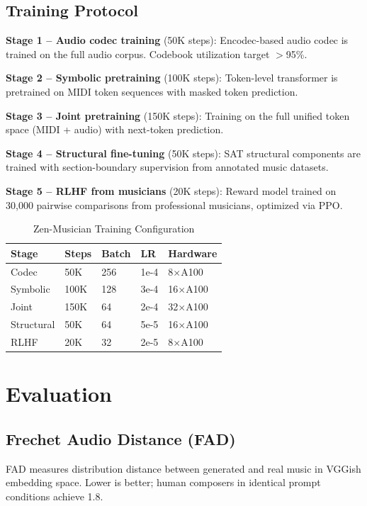 \documentclass[11pt,a4paper]{article}
\begin{document}
\subsection{Training Protocol}

\textbf{Stage 1 -- Audio codec training} (50K steps): Encodec-based audio codec is trained
on the full audio corpus. Codebook utilization target $>$95\%.

\textbf{Stage 2 -- Symbolic pretraining} (100K steps): Token-level transformer is pretrained
on MIDI token sequences with masked token prediction.

\textbf{Stage 3 -- Joint pretraining} (150K steps): Training on the full unified token space
(MIDI + audio) with next-token prediction.

\textbf{Stage 4 -- Structural fine-tuning} (50K steps): SAT structural components are trained
with section-boundary supervision from annotated music datasets.

\textbf{Stage 5 -- RLHF from musicians} (20K steps): Reward model trained on 30,000 pairwise
comparisons from professional musicians, optimized via PPO.

\begin{table}[H]
\centering
\begin{tabular}{lllll}
\toprule
\textbf{Stage} & \textbf{Steps} & \textbf{Batch} & \textbf{LR} & \textbf{Hardware} \\
\midrule
Codec & 50K & 256 & 1e-4 & 8$\times$A100 \\
Symbolic & 100K & 128 & 3e-4 & 16$\times$A100 \\
Joint & 150K & 64 & 2e-4 & 32$\times$A100 \\
Structural & 50K & 64 & 5e-5 & 16$\times$A100 \\
RLHF & 20K & 32 & 2e-5 & 8$\times$A100 \\
\bottomrule
\end{tabular}
\caption{Zen-Musician Training Configuration}
\end{table}

\section{Evaluation}

\subsection{Frechet Audio Distance (FAD)}

FAD measures distribution distance between generated and real music in VGGish embedding space.
Lower is better; human composers in identical prompt conditions achieve 1.8.
\end{document}
